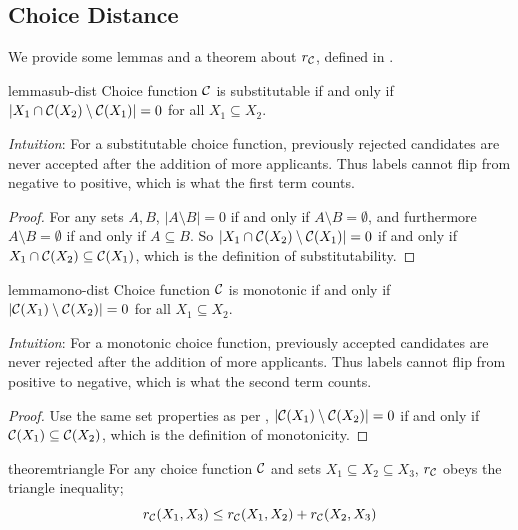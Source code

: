 \subsection{Choice Distance} \label{sec:dist-appendix}

We provide some lemmas and a theorem about $r_{\mathcal{C}}$,  defined in .

\begin{restatable}{lemma}{sub-dist}
\label{lem:substitutability-term}
Choice function $\mathcal{C}$ is substitutable if and only if $|X_1 \cap \mathcal{C}(X_2) \setminus \mathcal{C}(X_1)| = 0$ for all $X_1 \subseteq X_2$.
\end{restatable}

\textit{Intuition}:
For a substitutable choice function, previously rejected candidates are never accepted after the addition of more applicants. Thus labels cannot flip from negative to positive, which is what the first term counts.

\begin{proof}
For any sets $A, B$, $|A \setminus B| = 0$ if and only if $A \setminus B = \emptyset$, and furthermore $A \setminus B = \emptyset$ if and only if $A \subseteq B$. So $|X_1 \cap \mathcal{C}(X_2) \setminus \mathcal{C}(X_1)| = 0$ if and only if $X_1 \cap \mathcal{C}(X_2) \subseteq \mathcal{C}(X_1)$, which is the definition of substitutability.
\end{proof}

\begin{restatable}{lemma}{mono-dist}
\label{lem:monotonicity-term}
Choice function $\mathcal{C}$ is monotonic if and only if $|\mathcal{C}(X_1) \setminus \mathcal{C}(X_2)| = 0$ for all $X_1 \subseteq X_2$.
\end{restatable}

\textit{Intuition}:
For a monotonic choice function, previously accepted candidates are never rejected after the addition of more applicants. Thus labels cannot flip from positive to negative, which is what the second term counts.

\begin{proof}
Use the same set properties as per ,  $|\mathcal{C}(X_1) \setminus \mathcal{C}(X_2)| = 0$ if and only if $\mathcal{C}(X_1) \subseteq \mathcal{C}(X_2)$, which is the definition of monotonicity.
\end{proof}

\begin{restatable}{theorem}{triangle}
\label{thm:triangle-ineq}
For any choice function $\mathcal{C}$ and sets $X_1 \subseteq X_2 \subseteq X_3$, $r_{\mathcal{C}}$ obeys the triangle inequality;
$$r_{\mathcal{C}}(X_1, X_3) \leq r_{\mathcal{C}}(X_1, X_2) + r_{\mathcal{C}}(X_2, X_3)$$
\end{restatable}

